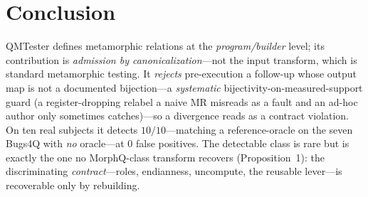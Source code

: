 \section{Conclusion}

QMTester defines metamorphic relations at the \emph{program/builder} level; its contribution is \emph{admission by canonicalization}---not the input transform, which is standard metamorphic testing. It \emph{rejects} pre-execution a follow-up whose output map is not a documented bijection---a \emph{systematic} bijectivity-on-measured-support guard (a register-dropping relabel a naive MR misreads as a fault and an ad-hoc author only sometimes catches)---so a divergence reads as a contract violation. On ten real subjects it detects $10/10$---matching a reference-oracle on the seven Bugs4Q with \emph{no} oracle---at $0$ false positives. The detectable class is rare but is exactly the one no MorphQ-class transform recovers (Proposition~1): the discriminating \emph{contract}---roles, endianness, uncompute, the reusable lever---is recoverable only by rebuilding.
